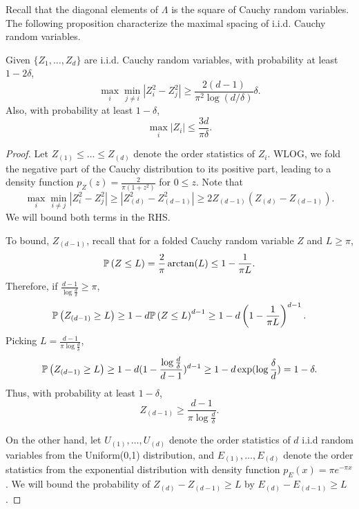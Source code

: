 Recall that the diagonal elements of $\Lambda$ is the square of Cauchy random variables. The following proposition characterize the maximal spacing of i.i.d. Cauchy random variables.
\begin{proposition}
\label{prop:maximalGapCauchy}
Given $\{Z_1,\ldots, Z_d\}$ are i.i.d. Cauchy random variables, with probability at least $1-2\delta$, 
\[
\max_i \min_{j\neq i} |Z_i^2 - Z_j^2| \ge \frac{2(d-1)}{\pi^2 \log(d/\delta)}\delta.
\]
Also, with probability at least $1-\delta$,
\[
\max_i |Z_i| \le \frac{3d}{\pi\delta}.
\]
\end{proposition}
\begin{proof}
Let $Z_{(1)}\le \ldots \le Z_{(d)}$ denote the order statistics of $Z_i$. 
WLOG, we fold the negative part of the Cauchy distribution to its positive part, leading to a density function $p_Z(z) = \frac{2}{\pi (1+z^2)}$ for $0\le z$.
Note that 
\[
\max_i \min_{i\neq j} |Z_i^2 - Z_j^2| \ge |Z_{(d)}^2 - Z_{(d-1)}^2| \ge 2Z_{(d-1)} \left(Z_{(d)} - Z_{(d-1)}\right).
\]
We will bound both terms in the RHS.

To bound, $Z_{(d-1)}$, recall that for a folded Cauchy random variable $Z$ and $L\ge \pi$,
\[
\mathbb{P}\left(Z \le L\right) = \frac{2}{\pi} \arctan(L) \le 1- \frac{1}{\pi L}.
\] 
Therefore, if $\frac{d-1}{\log \frac{d}{\delta}} \ge \pi$,
\[
\mathbb{P}\left(Z_{(d-1)} \ge L\right) \ge 1-d\mathbb{P}\left(Z\le L\right)^{d-1} \ge 1- d\left(1-  \frac{1}{\pi L}\right)^{d-1}.
\]
Picking $L = \frac{d-1}{\pi\log \frac{d}{\delta}}$,
\[
\mathbb{P}\left(Z_{(d-1)} \ge L\right) \ge 1- d(1- \frac{\log \frac{d}{\delta}}{d-1})^{d-1} \ge 1-d\exp(\log \frac{\delta}{d}) = 1-\delta.
\]
Thus, with probability at least $1- \delta$, 
\[
Z_{(d-1)} \ge \frac{d-1}{\pi\log \frac{d}{\delta}}.
\]

On the other hand, let $U_{(1)}, \ldots, U_{(d)}$ denote the order statistics of $d$ i.i.d random variables from the Uniform(0,1) distribution, and $E_{(1)}, \ldots, E_{(d)}$ denote the order statistics from the exponential distribution with density function $p_E(x) = \pi e^{-\pi x}$. 
We will bound the probability of $Z_{(d)} - Z_{(d-1)} \ge L$ by $E_{(d)} - E_{(d-1)} \ge L$.


\end{proof}
